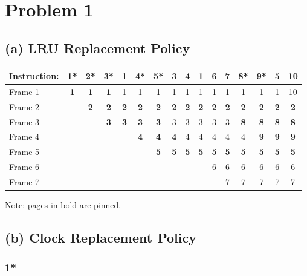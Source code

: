 \documentclass[a4paper, 12pt]{article}
\begin{document}
\section*{Problem 1}

\subsection*{(a) LRU Replacement Policy}

\begin{table}[h]
	\centering
	\begin{tabular}{l c c c c c c c c c c c c c c c}
		Instruction: & 1* & 2* & 3* & \underline{1} & 4* & 5* & \underline{3} &
		\underline{4} & 1 & 6 & 7 & 8* & 9* & 5 & 10 \\
		\hline
		Frame 1 & \textbf{1} & \textbf{1} & \textbf{1} & 1 & 1 & 1 & 1 & 1 & 1 &
		1 & 1 & 1 & 1 & 1 & 10 \\
		Frame 2 & & \textbf{2} & \textbf{2} & \textbf{2} & \textbf{2} &
		\textbf{2} & \textbf{2} & \textbf{2} & \textbf{2} & \textbf{2} &
		\textbf{2} & \textbf{2} & \textbf{2} & \textbf{2} & \textbf{2} \\
		Frame 3 & & & \textbf{3} & \textbf{3} & \textbf{3} & \textbf{3} & 3 & 3
		& 3 & 3 & 3 & \textbf{8} & \textbf{8} & \textbf{8} & \textbf{8} \\
		Frame 4 & & & & & \textbf{4} & \textbf{4} & \textbf{4} & 4 & 4 & 4 & 4 &
		4 & \textbf{9} & \textbf{9} & \textbf{9} \\
		Frame 5 & & & & & & \textbf{5} & \textbf{5} & \textbf{5} & \textbf{5} &
		\textbf{5} & \textbf{5} & \textbf{5} & \textbf{5} & \textbf{5} &
		\textbf{5} \\
		Frame 6 & & & & & & & & & & 6 & 6 & 6 & 6 & 6 & 6 \\
		Frame 7 & & & & & & & & & & & 7 & 7 & 7 & 7 & 7 \\
	\end{tabular}
\end{table}

Note: pages in bold are pinned.

\subsection*{(b) Clock Replacement Policy}
\centering

\subsubsection*{1*}

\end{document}
